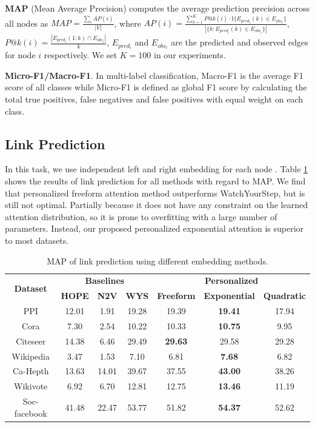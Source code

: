 \documentclass{article}
\begin{document}
\textbf{MAP} (Mean Average Precision) computes the average prediction precision across all nodes as 
$ MAP=\frac{\sum_i AP(i)}{|V|}$,
where $AP(i) = \frac{\sum_{k=1}^K P@k(i) \cdot \mathbb{I}\{E_{pred_i}(k) \in E_{obs_i}\}}{|\{k: E_{pred_i}(k) \in E_{obs_i}\}|}$, $P@k(i) = \frac{|E_{pred_i}(1:k) \cap E_{obs_i}|}{k}$, $E_{pred_i}$ and $E_{obs_i}$ are the predicted and observed edges for node $i$ respectively. We set $K=100$ in our experiments.

\textbf{Micro-F1/Macro-F1}. In multi-label classification, Macro-F1 is the average F1 score of all classes while Micro-F1 is defined as global F1 score by calculating the total true positives, false negatives and false positives with equal weight on each class.



 
\subsection{Link Prediction}
In this task, we use independent left and right embedding for each node .
Table \ref{tab:results_lp} shows the results of link prediction for all methods with regard to MAP. We find that personalized freeform attention method outperforms WatchYourStep, but is still not optimal. Partially because it does not have any constraint on the learned attention distribution, so it is prone to overfitting with a large number of parameters.  Instead, our proposed personalized exponential attention is superior to most datasets.

\begin{table}
\caption{MAP of link prediction using different embedding methods.}
\label{tab:results_lp}
\centering
\begin{tabular}{cccc|ccc}
\toprule
\multirow{2}{*}{\textbf{Dataset}} & \multicolumn{3}{c}{\textbf{Baselines}} & \multicolumn{3}{c}{\textbf{Personalized}} \\
 & \textbf{HOPE} & \textbf{N2V} & \textbf{WYS} & \textbf{Freeform} & \textbf{Exponential} & \textbf{Quadratic}\\
\midrule
PPI & 12.01  & 1.91 & 19.28 & 19.39 & \textbf{19.41} & 17.94\\
Cora & 7.30  & 2.54 & 10.22 & 10.33 & \textbf{10.75} & 9.95\\
Citeseer & 14.38  & 6.46  & 29.49 & \textbf{29.63} & 29.58 & 29.28 \\
Wikipedia & 3.47  & 1.53  & 7.10 & 6.81 & \textbf{7.68} & 6.82\\
Ca-Hepth & 13.63  & 14.01  & 39.67 & 37.55 & \textbf{43.00} & 38.26\\
Wikivote & 6.92  & 6.70  & 12.81 & 12.75 & \textbf{13.46} & 11.19\\
Soc-facebook & 41.48  & 22.47 & 53.77 & 51.82 & \textbf{54.37} & 52.62\\

\bottomrule
\end{tabular}
\end{table}
\end{document}
